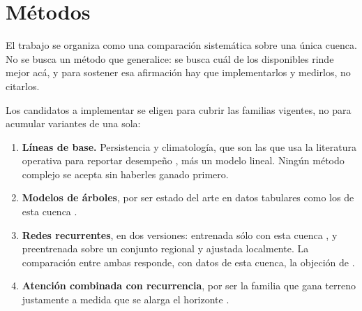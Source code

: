 \section{Métodos}


El trabajo se organiza como una comparación sistemática sobre una única cuenca.
No se busca un método que generalice: se busca cuál de los disponibles rinde mejor acá, y para
sostener esa afirmación hay que implementarlos y medirlos, no citarlos.

Los candidatos a implementar se eligen para cubrir las familias vigentes, no para acumular
variantes de una sola:

\begin{enumerate}[nosep]
  \item \textbf{Líneas de base.} Persistencia y climatología, que son las que usa la literatura
        operativa para reportar desempeño \cite{harrigan-2023-glofas-reforecast}, más un modelo
        lineal. Ningún método complejo se acepta sin haberles ganado primero.
  \item \textbf{Modelos de árboles}, por ser estado del arte en datos tabulares como los de esta
        cuenca \cite{grinsztajn-2022-arboles-tabular}.
  \item \textbf{Redes recurrentes}, en dos versiones: entrenada sólo con esta cuenca
        \cite{kratzert-2018-lstm-lluvia-escorrentia}, y preentrenada sobre un conjunto regional y
        ajustada localmente. La comparación entre ambas responde, con datos de esta cuenca, la
        objeción de \citet{kratzert-2024-nunca-una-sola-cuenca}.
  \item \textbf{Atención combinada con recurrencia}, por ser la familia que gana terreno
        justamente a medida que se alarga el horizonte \cite{liu-2025-rnn-a-transformers}.
\end{enumerate}



